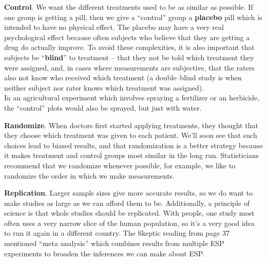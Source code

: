   {\bf Control}.  We want the different treatments used to be as
  similar as possible.  If one group is getting a pill, then we give
  a ``control'' group a {\bf placebo} pill which is intended to have no
  physical effect.  The placebo may have a very real psychological effect 
  because often subjects who believe that they are getting a drug 
  do actually improve.  To avoid these complexities, it is also
  important that subjects be ``{\bf blind}'' to treatment -- that they
  not be told which treatment they were assigned, and, in cases where
  measurements are subjective, that the raters also not know who
  received which treatment (a double--blind study is when neither
  subject nor rater knows which treatment was assigned).  
  \\
  In an agricultural experiment which involves spraying a fertilizer
  or an herbicide, the ``control'' plots would also be sprayed, but just
  with water. 

  {\bf Randomize}.  When doctors first started applying treatments,
  they thought that they choose which treatment was given to each
  patient. We'll soon see that such choices lead to biased results, and
  that randomization is a better strategy because it makes treatment
  and control groups most similar in the long run.  Statisticians
  recommend that we randomize whenever possible, for example, we like
  to randomize the order in which we make measurements.

  {\bf Replication}. Larger sample sizes give more accurate results,
  so we do want to make studies as large as we can afford them to
  be. Additionally, a principle of science is that  whole
  studies should be replicated.  With people, one study most often uses a
  very narrow slice of the human population, so it's a very good idea
  to run it again in a different country.  The Skeptic reading from
  page 37 mentioned ``meta analysis'' which combines results from
  multiple ESP experiments to broaden the inferences we can make about
  ESP. 

